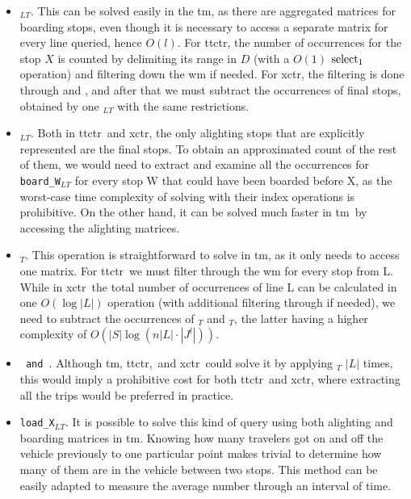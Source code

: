     \begin{itemize}
        \item \texttt{\boardX$_{LT}$}. This can be solved easily in the \gls{tm}, as there are aggregated matrices for boarding stops, even though it is necessary to access a separate matrix for every line queried, hence $O(l)$. For \gls{ttctr}, the number of occurrences for the stop $X$ is counted by delimiting its range in $D$ (with a $O(1)$ $\operatorname{select}_1$ operation) and filtering down the \gls{wm} if needed. For \gls{xctr}, the filtering is done through  and , and after that we must subtract the occurrences of final stops, obtained by one \texttt{\endX$_{LT}$} with the same restrictions.
        \item \texttt{\alightX$_{LT}$}. Both in \gls{ttctr}~and \gls{xctr}, the only alighting stops that are explicitly represented are the final stops. To obtain an approximated count of the rest of them, we would need to extract and examine all the occurrences for \texttt{board\_W$_{LT}$} for every stop W that could have been boarded before X, as the worst-case time complexity of solving with their index operations is prohibitive. On the other hand, it can be solved much faster in \gls{tm}~by accessing the alighting matrices.
        \item \texttt{\useL$_T$}. This operation is straightforward to solve in \gls{tm}, as it only needs to access one matrix. For \gls{ttctr}~we must filter through the \gls{wm} for every stop from L. While in \gls{xctr}~the total number of occurrences of line L can be calculated in one $O(\log|L|)$ operation (with additional filtering through  if needed), we need to subtract the occurrences of \startL$_T$ and \endL$_T$, the latter having a higher complexity of $O(|S|\log(n |L|\cdot |J^l|))$.
        \item \texttt{\boardT~and~\alightT}. Although \gls{tm}, \gls{ttctr},~and \gls{xctr}~could solve it by applying \useL$_T$ $|L|$ times, this would imply a prohibitive cost for both \gls{ttctr}~and \gls{xctr}, where extracting all the trips would be preferred in practice.
        \item \texttt{load\_X$_{LT}$}. It is possible to solve this kind of query using both alighting and boarding matrices in \gls{tm}. Knowing how many travelers got on and off the vehicle previously to one particular point makes trivial to determine how many of them are in the vehicle between two stops. This method can be easily adapted to measure the average number through an interval of time.
    \end{itemize}
    
